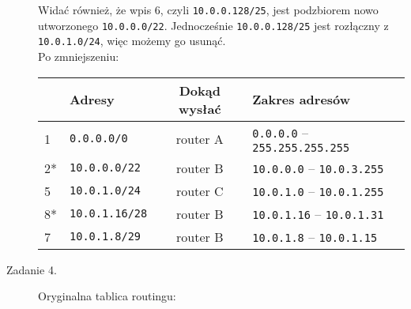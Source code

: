\documentclass[a4paper, oneside]{article}
\begin{document}
\begin{description}
{        Widać również, że wpis 6, czyli \texttt{10.0.0.128/25}, jest
        podzbiorem nowo utworzonego \texttt{10.0.0.0/22}. Jednocześnie
        \texttt{10.0.0.128/25} jest rozłączny z \texttt{10.0.1.0/24}, więc
        możemy go usunąć.
        \\

        Po zmniejszeniu:

        \begin{table}[H]
        \centering
        \begin{tabular}{|l|l|c|l|}
        \hline
            & \textbf{Adresy}     
            & \textbf{Dokąd wysłać} 
            & \textbf{Zakres adresów} \\ \hline \hline
        1   &  \texttt{0.0.0.0/0}
            & \cellcolor{blue!35}  router A 
            & \texttt{0.0.0.0} -- \texttt{255.255.255.255} \\ \hline
        2*  & \texttt{10.0.0.0/22}   
            & \cellcolor{green!35} router B 
            & \texttt{10.0.0.0} -- \texttt{10.0.3.255} \\ \hline
        5   & \texttt{10.0.1.0/24}   
            & \cellcolor{red!35}   router C 
            & \texttt{10.0.1.0} -- \texttt{10.0.1.255} \\ \hline
        8*  &\texttt{10.0.1.16/28}  
            & \cellcolor{green!35} router B 
            & \texttt{10.0.1.16} -- \texttt{10.0.1.31} \\ \hline
        7   &\texttt{10.0.1.8/29}   
            & \cellcolor{green!35} router B 
            & \texttt{10.0.1.8} -- \texttt{10.0.1.15} \\ \hline

        \end{tabular}
        \end{table}
    }

    \item[Zadanie 4.] {
        Oryginalna tablica routingu:

}
\end{description}
\end{document}
